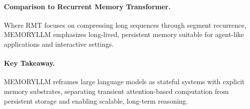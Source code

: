\documentclass[12pt]{article}
\begin{document}
\paragraph{Comparison to Recurrent Memory Transformer.}
Where RMT focuses on compressing long sequences through segment recurrence, MEMORYLLM emphasizes long-lived,
persistent memory suitable for agent-like applications and interactive settings.

\paragraph{Key Takeaway.}
MEMORYLLM reframes large language models as stateful systems with explicit memory substrates, separating
transient attention-based computation from persistent storage and enabling scalable, long-term reasoning.
\end{document}
